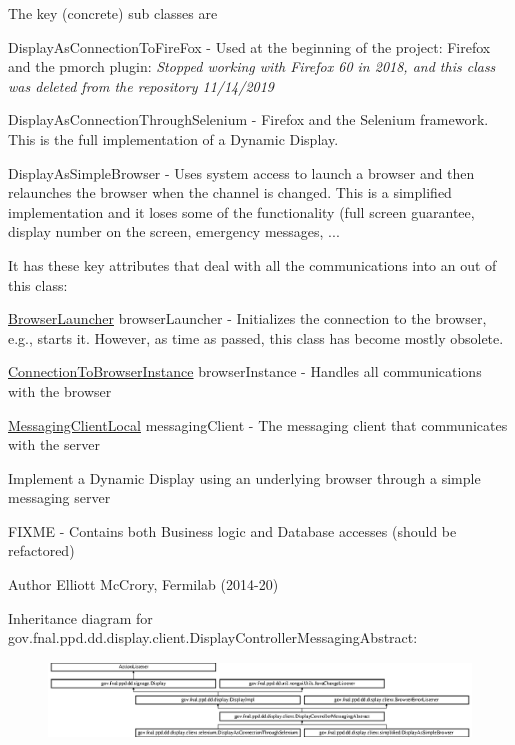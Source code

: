 The key (concrete) sub classes are 
\begin{DoxyItemize}
\item Display\-As\-Connection\-To\-Fire\-Fox -\/ Used at the beginning of the project\-: Firefox and the pmorch plugin\-: {\itshape Stopped working with Firefox 60 in 2018, and this class was deleted from the repository 11/14/2019} 
\item Display\-As\-Connection\-Through\-Selenium -\/ Firefox and the Selenium framework. This is the full implementation of a Dynamic Display. 
\item Display\-As\-Simple\-Browser -\/ Uses system access to launch a browser and then relaunches the browser when the channel is changed. This is a simplified implementation and it loses some of the functionality (full screen guarantee, display number on the screen, emergency messages, ... 





It has these key attributes that deal with all the communications into an out of this class\-: 
\begin{DoxyEnumerate}
\item \hyperlink{classgov_1_1fnal_1_1ppd_1_1dd_1_1display_1_1client_1_1BrowserLauncher}{Browser\-Launcher} browser\-Launcher -\/ Initializes the connection to the browser, e.\-g., starts it. However, as time as passed, this class has become mostly obsolete. 
\item \hyperlink{classgov_1_1fnal_1_1ppd_1_1dd_1_1display_1_1client_1_1ConnectionToBrowserInstance}{Connection\-To\-Browser\-Instance} browser\-Instance -\/ Handles all communications with the browser 
\item \hyperlink{classgov_1_1fnal_1_1ppd_1_1dd_1_1display_1_1client_1_1DisplayControllerMessagingAbstract_1_1MessagingClientLocal}{Messaging\-Client\-Local} messaging\-Client -\/ The messaging client that communicates with the server 
\end{DoxyEnumerate}



Implement a Dynamic Display using an underlying browser through a simple messaging server

F\-I\-X\-M\-E -\/ Contains both Business logic and Database accesses (should be refactored)

\begin{DoxyAuthor}{Author}
Elliott Mc\-Crory, Fermilab (2014-\/20) 
\end{DoxyAuthor}

\end{DoxyItemize}Inheritance diagram for gov.\-fnal.\-ppd.\-dd.\-display.\-client.\-Display\-Controller\-Messaging\-Abstract\-:\begin{figure}[H]
\begin{center}
\leavevmode
\includegraphics[height=2.015839cm]{classgov_1_1fnal_1_1ppd_1_1dd_1_1display_1_1client_1_1DisplayControllerMessagingAbstract}
\end{center}
\end{figure}
